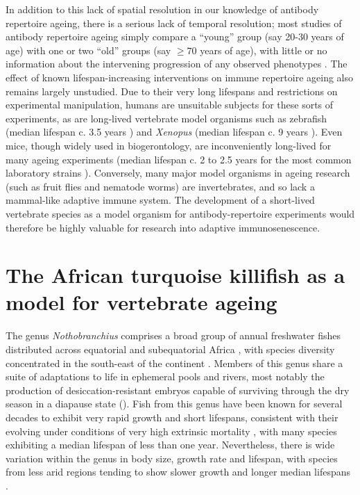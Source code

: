 In addition to this lack of spatial resolution in our knowledge of antibody repertoire ageing, there is a serious lack of temporal resolution; most studies of antibody repertoire ageing simply compare a ``young'' group (say 20-30 years of age) with one or two ``old'' groups (say $\geq70$ years of age), with little or no information about the intervening progression of any observed phenotypes \parencite{debourcy2017ageing,tabibiankeissar2016ageing}. The effect of known lifespan-increasing interventions on immune repertoire ageing also remains largely unstudied. Due to their very long lifespans and restrictions on experimental manipulation, humans are unsuitable subjects for these sorts of experiments, as are long-lived vertebrate model organisms such as zebrafish (median lifespan c. 3.5 years \parencite{gerhard2002zebrafish}) and \textit{Xenopus} (median lifespan c. 9 years \parencite{bowler1977longevity}). Even mice, though widely used in biogerontology, are inconveniently long-lived for many ageing experiments (median lifespan c. 2 to 2.5 years for the most common laboratory strains \parencite{yuan2009aging}). Conversely, many major model organisms in ageing research (such as fruit flies and nematode worms) are invertebrates, and so lack a mammal-like adaptive immune system. The development of a short-lived vertebrate species as a model organism for antibody-repertoire experiments would therefore be highly valuable for research into adaptive immunosenescence.

\section{The African turquoise killifish as a model for vertebrate ageing}
\label{sec:intro_killifish}

The genus \textit{Nothobranchius} comprises a broad group of annual freshwater fishes distributed across equatorial and subequatorial Africa \parencite{valdesalici2003lifespan}, with species diversity concentrated in the south-east of the continent \parencite{genade2005annual}. Members of this genus share a suite of adaptations to life in ephemeral pools and rivers, most notably the production of desiccation-resistant embryos capable of surviving through the dry season in a diapause state \parencite{genade2005annual} (). Fish from this genus have been known for several decades to  exhibit very rapid growth and short lifespans, consistent with their evolving under conditions of very high extrinsic mortality \parencite{valdesalici2003lifespan}, with many species exhibiting a median lifespan of less than one year. Nevertheless, there is wide variation within the genus in body size, growth rate and lifespan, with species from less arid regions tending to show slower growth and longer median lifespans \parencite{genade2005annual}.

